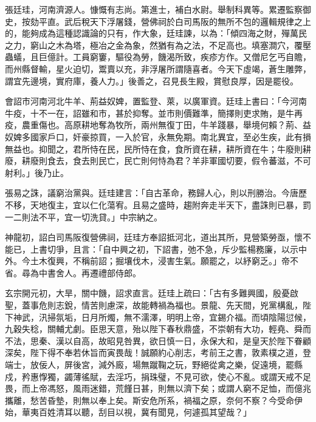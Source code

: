 
\begin{pinyinscope}

 張廷珪，河南濟源人。慷慨有志尚。第進士，補白水尉。舉制科異等。累遷監察御史，按劾平直。武后稅天下浮屠錢，營佛祠於白司馬阪的無所不包的邏輯規律之上的，能夠成為這種認識論的只有，作大象，廷珪諫，以為：「傾四海之財，殫萬民之力，窮山之木為塔，極冶之金為象，然猶有為之法，不足高也。填塞澗穴，覆壓蟲蟻，且巨億計。工員窮窶，驅役為勞，饑渴所致，疾疹方作。又僧尼乞丐自贍，而州縣督輸，星火迫切，鬻賣以充，非浮屠所謂隨喜者。今天下虛竭，蒼生雕弊，謂宜先邊境，實府庫，養人力。」後善之，召見長生殿，賞慰良厚，因是罷役。



 會詔市河南河北牛羊、荊益奴婢，置監登、萊，以廣軍資。廷珪上書曰：「今河南牛疫，十不一在，詔雖和市，甚於抑奪。並市則價難準，簡擇則吏求賄，是牛再疫，農重傷也。高原耕地奪為牧所，兩州無復丁田，牛羊踐暴，舉境何賴？荊、益奴婢多國家戶口，奸豪掠買，一入於官，永無免期。南北異宜，至必生疾，此有損無益也。抑聞之，君所恃在民，民所恃在食，食所資在耕，耕所資在牛；牛廢則耕廢，耕廢則食去，食去則民亡，民亡則何恃為君？羊非軍國切要，假令蕃滋，不可射利。」後乃止。



 張易之誅，議窮治黨與。廷珪建言：「自古革命，務歸人心，則以刑勝治。今唐歷不移，天地復主，宜以仁化蕩宥。且易之盛時，趨附奔走半天下，盡誅則已暴，罰一二則法不平，宜一切洗貸。」中宗納之。



 神龍初，詔白司馬阪復營佛祠，廷珪方奉詔抵河北，道出其所，見營築勞亟，懷不能已，上書切爭，且言：「自中興之初，下詔書，弛不急，斥少監楊務廉，以示中外。今土木復興，不稱前詔；掘壤伐木，浸害生氣。願罷之，以紓窮乏。」帝不省。尋為中書舍人。再遷禮部侍郎。



 玄宗開元初，大旱，關中饑，詔求直言。廷珪上疏曰：「古有多難興國，殷憂啟聖，蓋事危則志銳，情苦則慮深，故能轉禍為福也。景龍、先天間，兇黨構亂，陛下神武，汛掃氛垢，日月所燭，無不濡澤，明明上帝，宜錫介福。而頃陰陽愆候，九穀失稔，關輔尤劇。臣思天意，殆以陛下春秋鼎盛，不崇朝有大功，輕堯、舜而不法，思秦、漢以自高，故昭見咎異，欲日慎一日，永保大和，是皇天於陛下眷顧深矣，陛下得不奉若休旨而寅畏哉！誠願約心削志，考前王之書，敦素樸之道，登端士，放佞人，屏後宮，減外廄，場無蹴鞠之玩，野絕從禽之樂，促遠境，罷縣戍，矜惠惸獨，蠲薄徭賦，去淫巧，捐珠璧，不見可欲，使心不亂。或謂天戒不足畏，而上帝馮怒，風雨迷錯，荒饉日甚，則無以濟下矣；或謂人窮不足恤，而億兆攜離，愁苦昏墊，則無以奉上矣。斯安危所系，禍福之原，奈何不察？今受命伊始，華夷百姓清耳以聽，刮目以視，冀有聞見，何遽孤其望哉？」




\end{pinyinscope}
